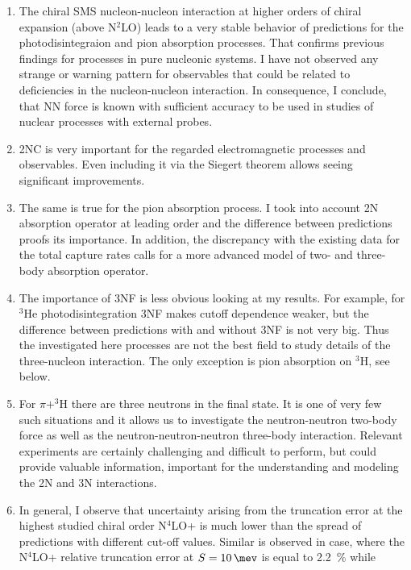 \documentclass[a4paper, 14pt]{extarticle}
\begin{document}
\begin{enumerate}
    \item The chiral SMS nucleon-nucleon interaction at higher orders of chiral expansion (above N$^2$LO)
    leads to a very stable behavior of predictions for the photodisintegraion and pion absorption processes.
    That confirms previous findings for processes in pure nucleonic systems.
    I have not observed any strange or warning pattern for observables that could be related to
    deficiencies in the nucleon-nucleon interaction.
    In consequence, I conclude, that NN force is known with sufficient accuracy to be used in studies of 
    nuclear processes with external probes.
    \item 2NC is very important for the regarded electromagnetic processes and observables. Even including it via the Siegert theorem allows seeing significant improvements.
    \item The same is true for the pion absorption process. I took into account 2N absorption operator at leading order and the difference between
    predictions proofs its importance.
    In addition, the discrepancy with the existing data for the total capture rates calls for a more advanced model of two-
    and three-body absorption operator.
    \item The importance of 3NF is less obvious looking at my results.
    For example, for $^3$He photodisintegration 3NF makes cutoff dependence weaker,
    but the difference between predictions with and without 3NF is not very big.
    Thus the investigated here processes are not the best field to study details
    of the three-nucleon interaction.
    The only exception is pion absorption on $^3$H, see below.
    \item For $\pi + ^3$H there are three neutrons in the final state. It is one of very few such situations and it allows us to investigate the
    neutron-neutron two-body force as well as the neutron-neutron-neutron three-body interaction. 
    Relevant  experiments are certainly challenging and difficult to perform, but
    could provide valuable information, important for the understanding and modeling
    the 2N and 3N interactions.
    \item In general, I observe that uncertainty arising from the truncation error at the highest
    studied chiral order N$^4$LO+ is much lower than the spread of predictions with different
    cut-off values. 
    Similar is observed in case, where the N$^4$LO+ relative 
    truncation error at $S=\SI{10}{\mev}$ is equal to \SI{2.2}{\percent} while

\end{enumerate}
\end{document}
